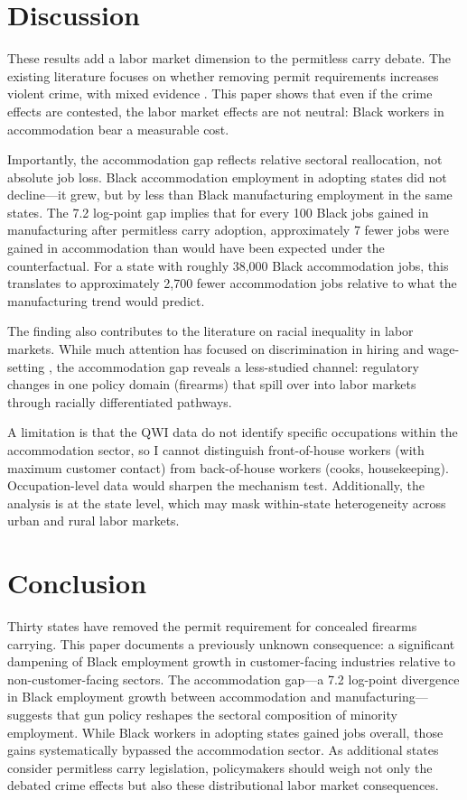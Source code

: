 \documentclass[12pt]{article}
\begin{document}
\section{Discussion}
\label{sec:discussion}

These results add a labor market dimension to the permitless carry debate. The existing literature focuses on whether removing permit requirements increases violent crime, with mixed evidence \citep{donohue2019right, lott2020more, rand2020effects}. This paper shows that even if the crime effects are contested, the labor market effects are not neutral: Black workers in accommodation bear a measurable cost.

Importantly, the accommodation gap reflects relative sectoral reallocation, not absolute job loss. Black accommodation employment in adopting states did not decline---it grew, but by less than Black manufacturing employment in the same states. The 7.2 log-point gap implies that for every 100 Black jobs gained in manufacturing after permitless carry adoption, approximately 7 fewer jobs were gained in accommodation than would have been expected under the counterfactual. For a state with roughly 38,000 Black accommodation jobs, this translates to approximately 2,700 fewer accommodation jobs relative to what the manufacturing trend would predict.

The finding also contributes to the literature on racial inequality in labor markets. While much attention has focused on discrimination in hiring \citep{bertrand2004emily, kline2022systemic} and wage-setting \citep{lang2020race}, the accommodation gap reveals a less-studied channel: regulatory changes in one policy domain (firearms) that spill over into labor markets through racially differentiated pathways.

A limitation is that the QWI data do not identify specific occupations within the accommodation sector, so I cannot distinguish front-of-house workers (with maximum customer contact) from back-of-house workers (cooks, housekeeping). Occupation-level data would sharpen the mechanism test. Additionally, the analysis is at the state level, which may mask within-state heterogeneity across urban and rural labor markets.

\section{Conclusion}
\label{sec:conclusion}

Thirty states have removed the permit requirement for concealed firearms carrying. This paper documents a previously unknown consequence: a significant dampening of Black employment growth in customer-facing industries relative to non-customer-facing sectors. The accommodation gap---a 7.2 log-point divergence in Black employment growth between accommodation and manufacturing---suggests that gun policy reshapes the sectoral composition of minority employment. While Black workers in adopting states gained jobs overall, those gains systematically bypassed the accommodation sector. As additional states consider permitless carry legislation, policymakers should weigh not only the debated crime effects but also these distributional labor market consequences.
\end{document}
